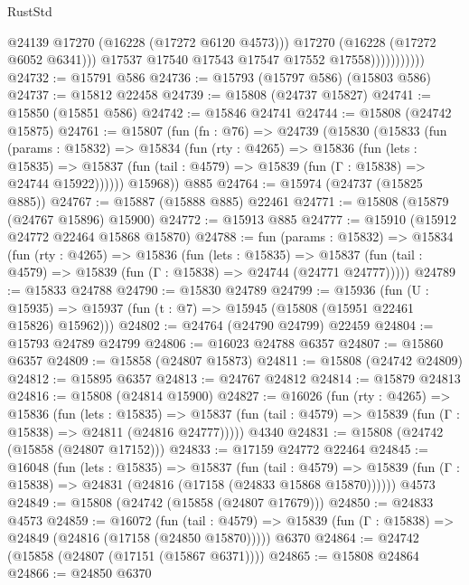 \begin{lexlean}{RustStd}
\begin{coremodule}
                              @24139
                              @17270
                              (@16228 (@17272 @6120 @4573)))
                            @17270
                            (@16228 (@17272 @6052 @6341)))
                          @17537
                          @17540
                          @17543
                          @17547
                          @17552
                          @17558)))))))))))
@24732 := @15791 @586
@24736 := @15793 (@15797 @586) (@15803 @586)
@24737 := @15812 @22458
@24739 := @15808 (@24737 @15827)
@24741 := @15850 (@15851 @586)
@24742 := @15846 @24741
@24744 := @15808 (@24742 @15875)
@24761 := @15807
    (fun (fn : @76) =>
    @24739
      (@15830
        (@15833
          (fun (params : @15832) =>
          @15834
            (fun (rty : @4265) =>
            @15836
              (fun (lets : @15835) =>
              @15837 (fun (tail : @4579) => @15839 (fun (Γ : @15838) => @24744 @15922))))))
        @15968))
    @885
@24764 := @15974 (@24737 (@15825 @885))
@24767 := @15887 (@15888 @885) @22461
@24771 := @15808 (@15879 (@24767 @15896) @15900)
@24772 := @15913 @885
@24777 := @15910 (@15912 @24772 @22464 @15868 @15870)
@24788 := fun (params : @15832) =>
  @15834
    (fun (rty : @4265) =>
    @15836
      (fun (lets : @15835) =>
      @15837 (fun (tail : @4579) => @15839 (fun (Γ : @15838) => @24744 (@24771 @24777)))))
@24789 := @15833 @24788
@24790 := @15830 @24789
@24799 := @15936
    (fun (U : @15935) => @15937 (fun (t : @7) => @15945 (@15808 (@15951 @22461 @15826) @15962)))
@24802 := @24764 (@24790 @24799) @22459
@24804 := @15793 @24789 @24799
@24806 := @16023 @24788 @6357
@24807 := @15860 @6357
@24809 := @15858 (@24807 @15873)
@24811 := @15808 (@24742 @24809)
@24812 := @15895 @6357
@24813 := @24767 @24812
@24814 := @15879 @24813
@24816 := @15808 (@24814 @15900)
@24827 := @16026
    (fun (rty : @4265) =>
    @15836
      (fun (lets : @15835) =>
      @15837 (fun (tail : @4579) => @15839 (fun (Γ : @15838) => @24811 (@24816 @24777)))))
    @4340
@24831 := @15808 (@24742 (@15858 (@24807 @17152)))
@24833 := @17159 @24772 @22464
@24845 := @16048
    (fun (lets : @15835) =>
    @15837
      (fun (tail : @4579) =>
      @15839 (fun (Γ : @15838) => @24831 (@24816 (@17158 (@24833 @15868 @15870))))))
    @4573
@24849 := @15808 (@24742 (@15858 (@24807 @17679)))
@24850 := @24833 @4573
@24859 := @16072
    (fun (tail : @4579) => @15839 (fun (Γ : @15838) => @24849 (@24816 (@17158 (@24850 @15870)))))
    @6370
@24864 := @24742 (@15858 (@24807 (@17151 (@15867 @6371))))
@24865 := @15808 @24864
@24866 := @24850 @6370

\end{coremodule}
\end{lexlean}

